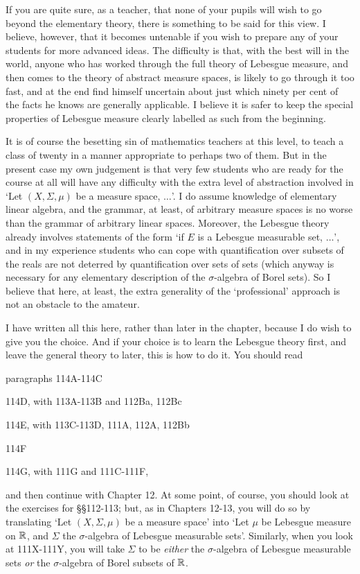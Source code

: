 If you are quite sure, as a teacher, that none of your pupils will wish
to go beyond the elementary theory, there is something to be said for
this view.   I believe, however, that it becomes untenable if you wish
to prepare any of your students for more advanced ideas.   The
difficulty is that, with the best will in the world, anyone who has
worked through the full theory of Lebesgue measure, and then comes to
the theory of abstract measure spaces, is likely to go through it too
fast, and at the end find himself uncertain about just which ninety per
cent of the facts he knows are generally applicable.   I believe it is
safer to keep the special properties of Lebesgue measure clearly
labelled as such from the beginning.

It is of course the besetting sin of mathematics teachers at this level,
to teach a class of twenty in a manner appropriate to perhaps two of
them.   But in the present case my own judgement is that very few
students who are ready for the course at all will have any difficulty
with the extra level of abstraction involved in `Let $(X,\Sigma,\mu)$
be a measure space, $\ldots$'.   I do assume knowledge of elementary
linear algebra, and the grammar, at least, of arbitrary measure spaces
is no worse than the grammar of arbitrary linear spaces.   Moreover, the
Lebesgue theory already involves statements of the form `if $E$ is a
Lebesgue measurable set, $\ldots$', and in my experience students who
can cope with quantification over subsets of the reals are not deterred
by quantification over sets of sets (which anyway is necessary for any
elementary description of the $\sigma$-algebra of Borel sets).   
So I believe
that here, at least, the extra generality of the `professional'
approach is not an obstacle to the amateur.

I have written all this here, rather than later in the chapter, because
I do wish to give you the choice.   And if your choice is to learn the
Lebesgue theory first, and leave the general theory to later, this is
how to do it.    You should read

\qquad paragraphs 114A-114C %

\qquad 114D, with 113A-113B and 112Ba, 112Bc

\qquad  114E, with 113C-113D, 111A, 112A, 112Bb

\qquad  114F

\qquad  114G, with 111G and 111C-111F, %

\noindent and then
continue with Chapter 12.   At some point, of course, you should look
at the exercises for \S\S112-113;  but, as in Chapters 12-13, you will
do so by translating `Let $(X,\Sigma,\mu)$ be a measure space' into
`Let $\mu$ be Lebesgue measure on $\Bbb R$, and $\Sigma$ the 
$\sigma$-algebra of Lebesgue measurable sets'.
Similarly, when you look at 111X-111Y, you will take $\Sigma$ to be {\it
either} the $\sigma$-algebra of Lebesgue measurable sets {\it or} the
$\sigma$-algebra of Borel subsets of $\Bbb R$.

\discrpage

